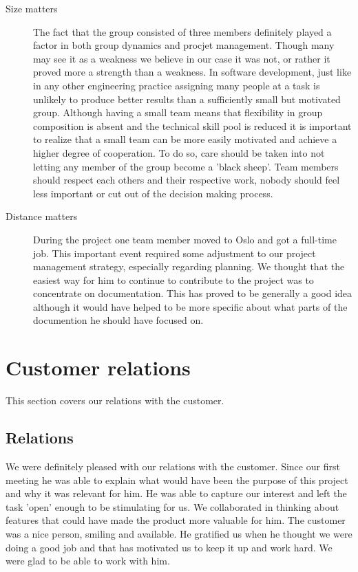 \begin{description}
\item[Size matters]
The fact that the group consisted of three members definitely played a factor in both group dynamics
and procjet management. Though many may see it as a weakness we believe in our case it was not,
or rather it proved more a strength than a weakness.
In software development, just like in any other engineering practice assigning many people
at a task is unlikely to produce better results than a sufficiently small but motivated group.
Although having a small team means that flexibility in group composition is absent and
the technical skill pool is reduced it is important to realize that a small team
can be more easily motivated and achieve a higher degree of cooperation.
To do so, care should be taken into not letting any member of the group become
a 'black sheep'. Team members should respect each others and their respective work,
nobody should feel less important or cut out of the decision making process.

\item[Distance matters]
During the project one team member moved to Oslo and got a full-time job.
This important event required some adjustment to our project management strategy,
especially regarding planning. We thought that the easiest way for him to continue
to contribute to the project was to concentrate on documentation.
This has proved to be generally a good idea although it would have helped
to be more specific about what parts of the documention he should have focused on.

\end{description}


\section{Customer relations}
This section covers our relations with the customer.

\subsection{Relations}
We were definitely pleased with our relations with the customer.
Since our first meeting he was able to explain what would have been the purpose of this project and why
it was relevant for him. He was able to capture our interest and left the task 'open' enough to be stimulating for us.
We collaborated in thinking about features that could have made the product more valuable for him.
The customer was a nice person, smiling and available. He gratified us when he thought we were doing a good job and
that has motivated us to keep it up and work hard. We were glad to be able to work with him.

